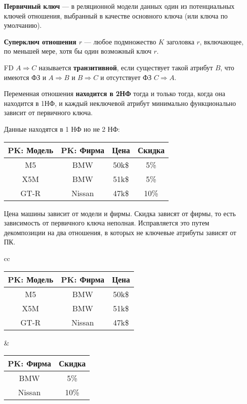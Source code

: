 \textbf{Первичный ключ} --- в реляционной модели данных один из потенциальных ключей отношения, выбранный в качестве основного ключа (или ключа по умолчанию).

\textbf{Суперключ отношения $r$} --- любое подмножество $K$ заголовка $r$, включающее, по меньшей мере, хотя бы один возможный ключ $r$.

FD $A \Rightarrow C$ называется \textbf{транзитивной}, если существует такой атрибут $B$, что имеются ФЗ и $A \Rightarrow B$ и $B \Rightarrow C$ и отсутствует ФЗ $C \Rightarrow A$.

Переменная отношения \textbf{находится в 2НФ} тогда и только тогда, когда она находится в 1НФ, и каждый неключевой атрибут минимально функционально зависит от первичного ключа.

Данные находятся в 1 НФ но не 2 НФ:

\begin{tabular}{|c|c|c|c|}
    \hline
    \textbf{PK: Модель} & \textbf{PK: Фирма} & Цена & Скидка \\
    \hline
    \hline
    M5  & BMW     & 50k\$ & 5\% \\
    \hline
    X5M & BMW     & 51k\$ & 5\% \\
    \hline
    GT-R & Nissan & 47k\$ & 10\% \\
    \hline
\end{tabular}

Цена машины зависит от модели и фирмы. Скидка зависят от фирмы, то есть зависимость от первичного ключа неполная. Исправляется это путем декомпозиции на два отношения, в которых не ключевые атрибуты зависят от ПК.

\begin{tabular}{cc}
    \begin{minipage}{.55\linewidth}

        \begin{tabular}{|c|c|c|}
            \hline
            \textbf{PK: Модель} & \textbf{PK: Фирма} & Цена \\
            \hline
            \hline
            M5  & BMW     & 50k\$ \\
            \hline
            X5M & BMW     & 51k\$ \\
            \hline
            GT-R & Nissan & 47k\$ \\
            \hline
        \end{tabular}

    \end{minipage} &
    \begin{minipage}{.55\linewidth}

        \begin{tabular}{|c|c|}
            \hline
            \textbf{PK: Фирма} & Скидка \\
            \hline
            \hline
            BMW     & 5\% \\
            \hline
            Nissan  & 10\% \\
            \hline
        \end{tabular}

    \end{minipage}
\end{tabular}

